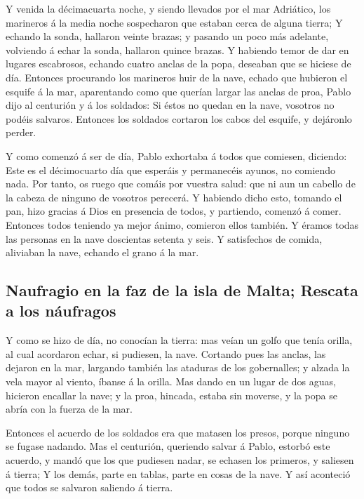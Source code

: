  Y venida la décimacuarta noche, y siendo llevados por el
mar Adriático, los marineros á la media noche sospecharon que estaban
cerca de alguna tierra;  Y echando la sonda, hallaron
veinte brazas; y pasando un poco más adelante, volviendo á echar la
sonda, hallaron quince brazas.  Y habiendo temor de dar en
lugares escabrosos, echando cuatro anclas de la popa, deseaban que se
hiciese de día.  Entonces procurando los marineros huir de
la nave, echado que hubieron el esquife á la mar, aparentando como que
querían largar las anclas de proa,  Pablo dijo al centurión
y á los soldados: Si éstos no quedan en la nave, vosotros no podéis
salvaros.  Entonces los soldados cortaron los cabos del
esquife, y dejáronlo perder.

 Y como comenzó á ser de día, Pablo exhortaba á todos que
comiesen, diciendo: Este es el décimocuarto día que esperáis y
permanecéis ayunos, no comiendo nada.  Por tanto, os ruego
que comáis por vuestra salud: que ni aun un cabello de la cabeza de
ninguno de vosotros perecerá.  Y habiendo dicho esto,
tomando el pan, hizo gracias á Dios en presencia de todos, y partiendo,
comenzó á comer.  Entonces todos teniendo ya mejor ánimo,
comieron ellos también.  Y éramos todas las personas en la
nave doscientas setenta y seis.  Y satisfechos de comida,
aliviaban la nave, echando el grano á la mar.

\hypertarget{naufragio-en-la-faz-de-la-isla-de-malta-rescata-a-los-nuxe1ufragos}{%
\subsection{Naufragio en la faz de la isla de Malta; Rescata a los
náufragos}\label{naufragio-en-la-faz-de-la-isla-de-malta-rescata-a-los-nuxe1ufragos}}

 Y como se hizo de día, no conocían la tierra: mas veían un
golfo que tenía orilla, al cual acordaron echar, si pudiesen, la nave.
 Cortando pues las anclas, las dejaron en la mar, largando
también las ataduras de los gobernalles; y alzada la vela mayor al
viento, íbanse á la orilla.  Mas dando en un lugar de dos
aguas, hicieron encallar la nave; y la proa, hincada, estaba sin
moverse, y la popa se abría con la fuerza de la mar.

 Entonces el acuerdo de los soldados era que matasen los
presos, porque ninguno se fugase nadando.  Mas el
centurión, queriendo salvar á Pablo, estorbó este acuerdo, y mandó que
los que pudiesen nadar, se echasen los primeros, y saliesen á tierra;
 Y los demás, parte en tablas, parte en cosas de la nave. Y
así aconteció que todos se salvaron saliendo á tierra.

